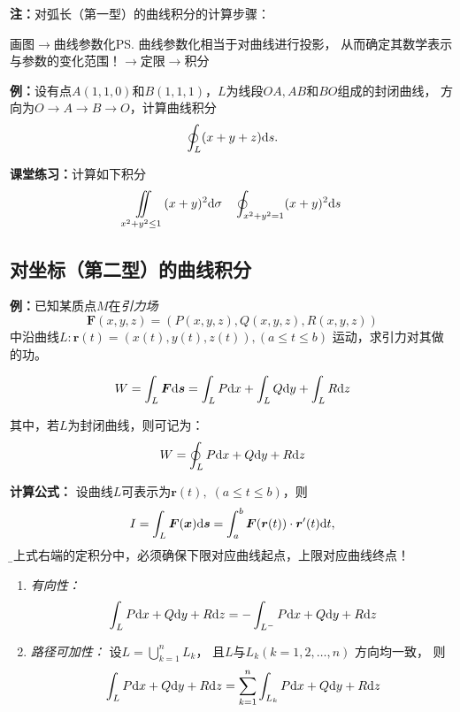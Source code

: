 {\bf 注：}对弧长（第一型）的曲线积分的计算步骤：

\begin{center}
	画图$\to$曲线参数化\ps{曲线参数化相当于对曲线进行投影，
	从而确定其数学表示与参数的变化范围！}$\to$定限$\to$积分
\end{center}


{\bf 例：}设有点$A(1,1,0)$和$B(1,1,1)$，$L$为线段$OA,AB$和$BO$组成的封闭曲线，
方向为$O\to A\to B\to O$，计算曲线积分
$$\oint_L(x+y+z)\mathrm{d} s.$$

{\bf 课堂练习：}计算如下积分
$$
	\iint\limits_{x^2+y^2\leq 1}(x+y)^2\mathrm{d}\sigma
	\quad
	\oint_{x^2+y^2=1}(x+y)^2\mathrm{d} s
$$


\subsection{对坐标（第二型）的曲线积分}


{\bf 例：}已知某质点$M$在{\it 引力场}
$$\bm{F}(x,y,z)=(P(x,y,z),Q(x,y,z),R(x,y,z))$$
中沿曲线$L:\bm{r}(t)=(x(t),y(t),z(t)),(a\leq t\leq b)$
运动，求引力对其做的功。

$${W=\displaystyle\int_L\bm{F}\mathrm{d}\bm{s}=\displaystyle\int_LP\mathrm{d} x+\displaystyle\int_LQ\mathrm{d} y+\displaystyle\int_LR\mathrm{d} z}$$

其中，若$L$为封闭曲线，则可记为：
$$W=\oint_LP\mathrm{d} x+Q\mathrm{d} y+R\mathrm{d} z$$

{\bf 计算公式：}
设曲线$L$可表示为$\bm{r}(t),\;(a\leq t\leq b)$，则
$$I=\displaystyle\int_L\bm{F}(\bm{x})\mathrm{d}\bm{s}=\displaystyle\int_a^b\bm{F}(\bm{r}(t))\cdot\bm{r}'(t)\mathrm{d}
t,$$ {\b 在上式右端的定积分中，必须确保下限对应曲线起点，上限对应曲线终点！}


\begin{enumerate}[(1)]
  \setlength{\itemindent}{1cm}
  \item {\it 有向性：}
  $$\displaystyle\int_LP\mathrm{d} x+Q\mathrm{d} y+R\mathrm{d} z=-\displaystyle\int_{L^-}P\mathrm{d} x+Q\mathrm{d} y+R\mathrm{d} z$$
  \item {\it 路径可加性：} 设$L=\bigcup_{k=1}^nL_k$， 且$L$与$L_k(k=1,2,\ldots,n)$
  方向均一致， 则
  $$\displaystyle\int_LP\mathrm{d} x+Q\mathrm{d} y+R\mathrm{d} z=\sum\limits_{k=1}^n\displaystyle\int_{L_k}P\mathrm{d} x+Q\mathrm{d} y+R\mathrm{d} z$$
\end{enumerate}

